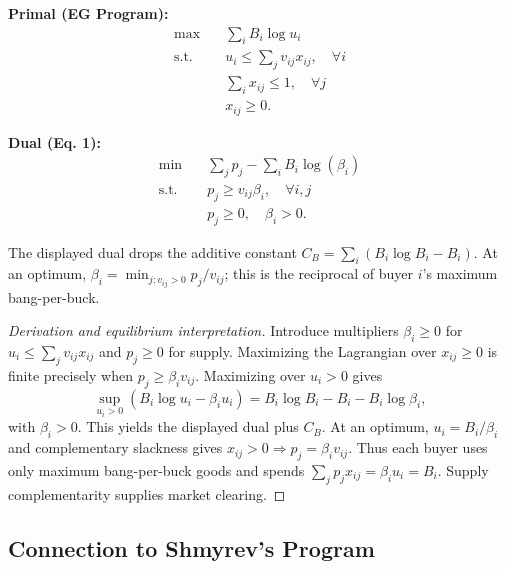 \documentclass[11pt, a4paper]{article}
\begin{document}
\noindent
\begin{minipage}[t]{0.48\textwidth}
    \textbf{Primal (EG Program):}
    \begin{align*}
        \max \quad & \sum_{i} B_i \log u_i \\
        \text{s.t.} \quad & u_i \leq \sum_{j} v_{ij} x_{ij}, \quad \forall i \\
        & \sum_{i} x_{ij} \leq 1, \quad \forall j \\
        & x_{ij} \geq 0.
    \end{align*}
\end{minipage}
\hfill \vrule{} \hfill
\begin{minipage}[t]{0.48\textwidth}
    \textbf{Dual (Eq. 1):}
    \begin{align*}
        \min \quad & \sum_{j} p_j - \sum_{i} B_i \log(\beta_i) \\
        \text{s.t.} \quad & p_j \geq v_{ij} \beta_i, \quad \forall i, j \\
        & p_j\ge0,\quad\beta_i>0.
    \end{align*}
\end{minipage}

\begin{remark}
    The displayed dual drops the additive constant $C_B=\sum_i(B_i\log B_i-B_i)$. At an optimum, $\beta_i=\min_{j:v_{ij}>0}p_j/v_{ij}$; this is the reciprocal of buyer $i$'s maximum bang-per-buck.
\end{remark}

\begin{proof}[Derivation and equilibrium interpretation]
Introduce multipliers $\beta_i\ge0$ for $u_i\le\sum_jv_{ij}x_{ij}$ and $p_j\ge0$ for supply. Maximizing the Lagrangian over $x_{ij}\ge0$ is finite precisely when $p_j\ge\beta_i v_{ij}$. Maximizing over $u_i>0$ gives
\[
\sup_{u_i>0}(B_i\log u_i-\beta_i u_i)
=B_i\log B_i-B_i-B_i\log\beta_i,
\]
with $\beta_i>0$. This yields the displayed dual plus $C_B$. At an optimum, $u_i=B_i/\beta_i$ and complementary slackness gives $x_{ij}>0\Rightarrow p_j=\beta_i v_{ij}$. Thus each buyer uses only maximum bang-per-buck goods and spends $\sum_jp_jx_{ij}=\beta_i u_i=B_i$. Supply complementarity supplies market clearing.
\end{proof}

\subsection{Connection to Shmyrev's Program}
\end{document}

